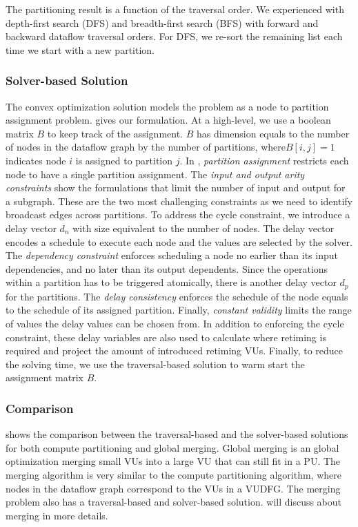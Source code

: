 The partitioning result is a function of the traversal order.
We experienced with depth-first search (DFS) and breadth-first search (BFS) with forward and
backward dataflow traversal orders.
For DFS, we re-sort the remaining list each time we start with a new partition.

\subsubsection{Solver-based Solution}
The convex optimization solution models the problem as a node to partition assignment problem.
 gives our formulation.
At a high-level, we use a boolean matrix $B$ to keep track of the assignment. 
$B$ has dimension equals to the number of nodes in the dataflow graph by the number of partitions, where$B[i,j]=1$ 
indicates node $i$ is assigned to partition $j$.
In , \emph{partition assignment} restricts each node to have a single partition assignment.
The \emph{input and output arity constraints} show the formulations that limit the number of input
and output for a subgraph.
These are the two most challenging constraints as we need to identify broadcast edges across partitions.
To address the cycle constraint, we introduce a delay vector $d_n$ with size equivalent to the number of nodes. 
The delay vector encodes a schedule to execute each node and the values are selected by the solver.
The \emph{dependency constraint} enforces scheduling a node no earlier than its input dependencies, and
no later than its output dependents.
Since the operations within a partition has to be triggered atomically, there is another delay
vector $d_p$ for the partitions. The \emph{delay consistency} enforces the schedule of the node equals to the
schedule of its assigned partition.
Finally, \emph{constant validity} limits the range of values the delay values can be chosen from.
In addition to enforcing the cycle constraint, 
these delay variables are also used to calculate where retiming is required and 
project the amount of introduced retiming VUs. 
Finally, to reduce the solving time, we use the traversal-based solution to warm start the assignment matrix
$B$.



\subsubsection{Comparison}
 shows the comparison between the traversal-based and the solver-based solutions for both
compute partitioning and global merging.
Global merging is an global optimization merging small VUs into a large VU that can still fit in
a PU. 
The merging algorithm is very similar to the compute partitioning algorithm, where nodes in the
dataflow graph correspond to the VUs in a VUDFG. 
The merging problem also has a traversal-based and solver-based solution.
 will discuss about merging in more details.

